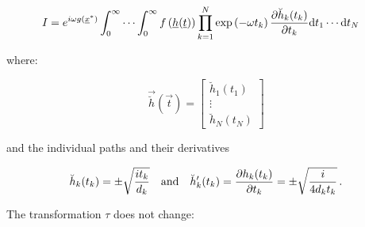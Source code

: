 \documentclass[a4paper,10pt]{article}
\begin{document}
\begin{equation}
\begin{split}
 I & = e^{i \omega g\left(\underline{x}^{*}\right)}
       \int_0^\infty \cdots \int_0^\infty
         f\left(\underline{h}(\underline{t})\right)
         \prod_{k=1}^N \exp\left(-\omega t_k\right)
         \frac{\partial \breve{h}_k(t_k)}{\partial t_k}
       \mathrm{d}t_1 \cdots \mathrm{d}t_N
\end{split}
\end{equation}

where:

\begin{equation}
 \vec{\breve{h}}\left(\vec{t}\right) =
 \begin{bmatrix}
  \breve{h}_1(t_1) \\ \vdots \\ \breve{h}_N(t_N)
 \end{bmatrix}
\end{equation}

and the individual paths and their derivatives

\begin{equation}
 \breve{h}_k(t_k) = \pm \sqrt{\frac{i t_k}{d_k}}
 \quad \mathrm{and} \quad
 \breve{h}_k^{\prime}(t_k) = \frac{\partial h_k(t_k)}{\partial t_k} = \pm \sqrt{\frac{i}{4 d_{k} t_k}} \,.
\end{equation}

The transformation $\tau$ does not change:
\end{document}
